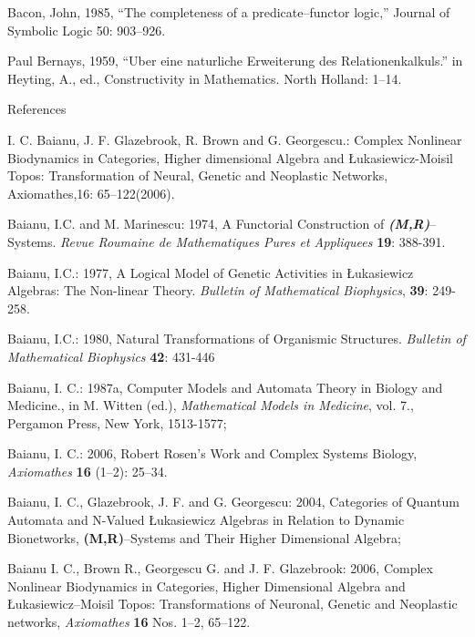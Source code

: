 \documentclass[12pt]{article}
\theoremstyle{plain}
\theoremstyle{definition}
\numberwithin{equation}{section}
\begin{document}
\begin{thebibliography}{99}

Bacon, John, 1985, ``The completeness of a predicate--functor logic,'' Journal of Symbolic Logic 50: 903--926. 

Paul Bernays, 1959, ``Uber eine naturliche Erweiterung des Relationenkalkuls.'' in Heyting, A., ed., Constructivity in Mathematics. North Holland: 1--14.

References 

I. C. Baianu, J. F. Glazebrook, R. Brown and G. Georgescu.: Complex Nonlinear Biodynamics in Categories, Higher dimensional Algebra and \L ukasiewicz-Moisil Topos: Transformation of Neural, Genetic and Neoplastic Networks, Axiomathes,16: 65--122(2006).


Baianu, I.C. and M. Marinescu: 1974, A Functorial Construction of \emph{\textbf{(M,R)}}-- Systems. \emph{Revue Roumaine de Mathematiques Pures et Appliquees} \textbf{19}: 388-391.

Baianu, I.C.: 1977, A Logical Model of Genetic Activities in \L ukasiewicz
Algebras: The Non-linear Theory. \emph{Bulletin of Mathematical Biophysics},
\textbf{39}: 249-258.

Baianu, I.C.: 1980, Natural Transformations of Organismic
Structures. \emph{Bulletin of Mathematical Biophysics}
\textbf{42}: 431-446


Baianu, I. C.: 1987a, Computer Models and Automata Theory in
Biology and Medicine.,  in M. Witten (ed.), \emph{Mathematical
Models in Medicine}, vol. 7., Pergamon Press, New York, 1513-1577; 


Baianu, I. C.: 2006, Robert Rosen's Work and Complex Systems
Biology, \emph{Axiomathes} \textbf{16} (1--2): 25--34.

Baianu, I. C., Glazebrook, J. F. and G. Georgescu: 2004,
Categories of Quantum Automata and N-Valued \L ukasiewicz Algebras
in Relation to Dynamic Bionetworks, \textbf{(M,R)}--Systems and
Their Higher Dimensional Algebra; 


Baianu I. C., Brown R., Georgescu G. and J. F. Glazebrook: 2006,
Complex Nonlinear Biodynamics in Categories, Higher Dimensional
Algebra and \L ukasiewicz--Moisil Topos: Transformations of
Neuronal, Genetic and Neoplastic networks, \emph{Axiomathes}
\textbf{16} Nos. 1--2, 65--122.


\end{thebibliography}
\end{document}
